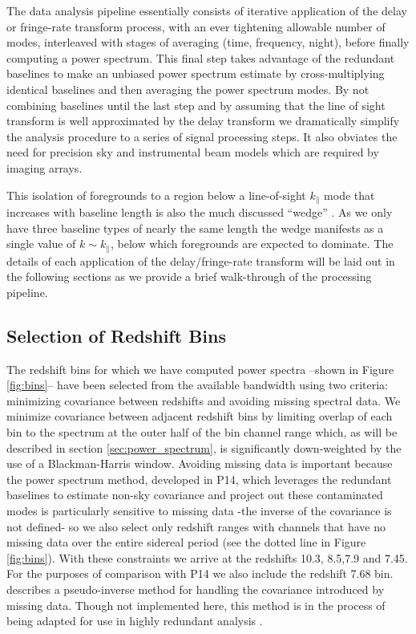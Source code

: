 \documentclass{aastex}
\begin{document}
The data analysis pipeline essentially consists of iterative application of the delay or fringe-rate transform process, with an ever tightening allowable number of modes, interleaved with stages of averaging (time, frequency, night), before finally computing a power spectrum.  This final step takes advantage of the redundant baselines to make an unbiased power spectrum estimate by cross-multiplying identical baselines and then averaging the power spectrum modes. By not combining baselines until the last step and by assuming that the line of sight transform is well approximated by the delay transform we dramatically simplify the analysis procedure to a series of signal processing steps. It also obviates the need for precision sky and instrumental beam models which are required by imaging arrays.  

This isolation of foregrounds to a region below a line-of-sight $k_\parallel$ mode that increases with baseline length is also the much discussed ``wedge'' \citep{PhysRevD.90.023018,PhysRevD.90.023019,Thyagarajan:2013p10039,Pober:2013p9942,Trott:2012p10466,Morales:2012p8790,Parsons:2012p8896,Vedantham:2012p10297,Datta:2010p8781,Parsons:2009p7859}. As we only have three baseline types of nearly the same length the wedge manifests as a single value of $k\sim k_\parallel$, below which foregrounds are expected to dominate.  The details of each application of the delay/fringe-rate transform will be laid out in the following sections as we provide a brief walk-through of the processing pipeline. 


\subsection{Selection of Redshift Bins}
The redshift bins for which we have computed power spectra --shown in Figure \ref{fig:bins}-- have been selected from the available bandwidth using two criteria: minimizing covariance between redshifts and avoiding missing spectral data. We minimize covariance between adjacent redshift bins by limiting overlap of each bin to the spectrum at the outer half of the bin channel range which, as will be described in section \ref{sec:power_spectrum}, is significantly down-weighted by the use of a Blackman-Harris window.   Avoiding missing data is important because the power spectrum method, developed in P14, which leverages the redundant baselines to estimate non-sky covariance and project out these contaminated modes is particularly sensitive to missing data -the inverse of the covariance is not defined- so we also select only redshift ranges with channels that have no missing data over the entire sidereal period (see the dotted line in Figure \ref{fig:bins}).  With these constraints we arrive at the redshifts 10.3, 8.5,7.9 and 7.45.  For the purposes of comparison with P14 we also include the redshift 7.68 bin.  \citet{Dillon:2013p10497} describes a pseudo-inverse method for handling the covariance introduced by missing data. Though not implemented here, this method is in the process of being adapted for use in highly redundant analysis \citep{PhysRevD.90.023018,PhysRevD.90.023019}.  
\end{document}
